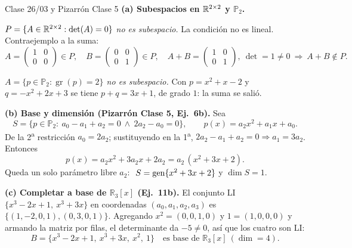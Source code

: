 \begin{ejemplo}{Clase 26/03 y Pizarrón Clase 5}
\textbf{(a) Subespacios en $\mathbb{R}^{2\times2}$ y $\mathbb{P}_2$.}

\emph{$P=\{A\in\mathbb{R}^{2\times2}:\det(A)=0\}$ no es subespacio.} La condición no es lineal. Contraejemplo a la suma:
\[
A=\begin{pmatrix}1&0\\0&0\end{pmatrix}\in P,\quad
B=\begin{pmatrix}0&0\\0&1\end{pmatrix}\in P,\quad
A+B=\begin{pmatrix}1&0\\0&1\end{pmatrix},\ \det=1\neq0\ \Rightarrow\ A+B\notin P.
\]

\emph{$A=\{p\in\mathbb{P}_2:\operatorname{gr}(p)=2\}$ no es subespacio.} Con $p=x^2+x-2$ y $q=-x^2+2x+3$ se tiene $p+q=3x+1$, de grado $1$: la suma se salió.

\smallskip
\textbf{(b) Base y dimensión (Pizarrón Clase 5, Ej.\ 6b).} Sea
\[
S=\{p\in\mathbb{P}_2:\ a_0-a_1+a_2=0\ \wedge\ 2a_2-a_0=0\},\qquad p(x)=a_2x^2+a_1x+a_0.
\]
De la 2\textsuperscript{a} restricción $a_0=2a_2$; sustituyendo en la 1\textsuperscript{a}, $2a_2-a_1+a_2=0\Rightarrow a_1=3a_2$. Entonces
\[
p(x)=a_2x^2+3a_2x+2a_2=a_2\,(x^2+3x+2).
\]
Queda un solo parámetro libre $a_2$: $\ S=\operatorname{gen}\{x^2+3x+2\}$ y $\dim S=1$.

\smallskip
\textbf{(c) Completar a base de $\mathbb{R}_3[x]$ (Ej.\ 11b).} El conjunto LI $\{x^3-2x+1,\ x^3+3x\}$ en coordenadas $(a_0,a_1,a_2,a_3)$ es $\{(1,-2,0,1),(0,3,0,1)\}$. Agregando $x^2=(0,0,1,0)$ y $1=(1,0,0,0)$ y armando la matriz por filas, el determinante da $-5\neq0$, así que los cuatro son LI:
\[
B=\{x^3-2x+1,\ x^3+3x,\ x^2,\ 1\}\quad\text{es base de }\mathbb{R}_3[x]\ (\dim=4).
\]
\end{ejemplo}

